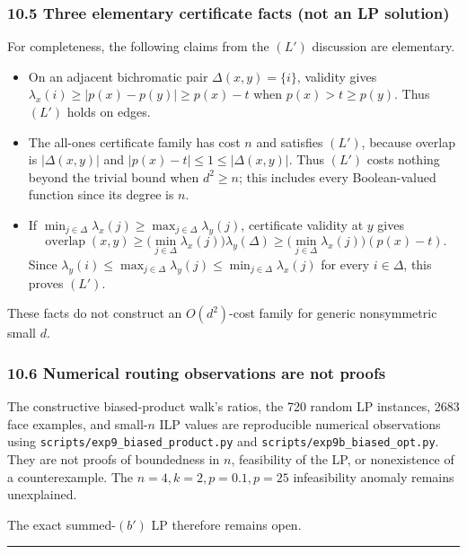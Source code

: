 \subsubsection{10.5 Three elementary certificate facts (not an LP solution)}\label{three-elementary-certificate-facts-not-an-lp-solution}

For completeness, the following claims from the \((L')\) discussion are elementary.

\begin{itemize}
\tightlist
\item
  On an adjacent bichromatic pair \(\Delta(x,y)=\{i\}\), validity gives \(\lambda_x(i)\ge|p(x)-p(y)|\ge p(x)-t\) when \(p(x)>t\ge p(y)\). Thus \((L')\) holds on edges.
\item
  The all-ones certificate family has cost \(n\) and satisfies \((L')\), because overlap is \(|\Delta(x,y)|\) and \(|p(x)-t|\le1\le|\Delta(x,y)|\). Thus \((L')\) costs nothing beyond the trivial bound when \(d^2\ge n\); this includes every Boolean-valued function since its degree is \(n\).
\item
  If \(\min_{j\in\Delta}\lambda_x(j)\ge\max_{j\in\Delta}\lambda_y(j)\), certificate validity at \(y\) gives
  \[
  \operatorname{overlap}(x,y)
  \ge\Big(\min_{j\in\Delta}\lambda_x(j)\Big)\lambda_y(\Delta)
  \ge\Big(\min_{j\in\Delta}\lambda_x(j)\Big)(p(x)-t).
  \]
  Since \(\lambda_y(i)\le\max_{j\in\Delta}\lambda_y(j)\le\min_{j\in\Delta}\lambda_x(j)\) for every \(i\in\Delta\), this proves \((L')\).
\end{itemize}

These facts do not construct an \(O(d^2)\)-cost family for generic nonsymmetric small \(d\).

\subsubsection{10.6 Numerical routing observations are not proofs}\label{numerical-routing-observations-are-not-proofs}

The constructive biased-product walk's ratios, the 720 random LP instances, 2683 face examples, and small-\(n\) ILP values are reproducible numerical observations using \texttt{scripts/exp9\_biased\_product.py} and \texttt{scripts/exp9b\_biased\_opt.py}. They are not proofs of boundedness in \(n\), feasibility of the LP, or nonexistence of a counterexample. The \(n=4,k=2,p=0.1,p=25\) infeasibility anomaly remains unexplained.

The exact summed-\((b')\) LP therefore remains open.

\begin{center}\rule{0.5\linewidth}{0.5pt}\end{center}
